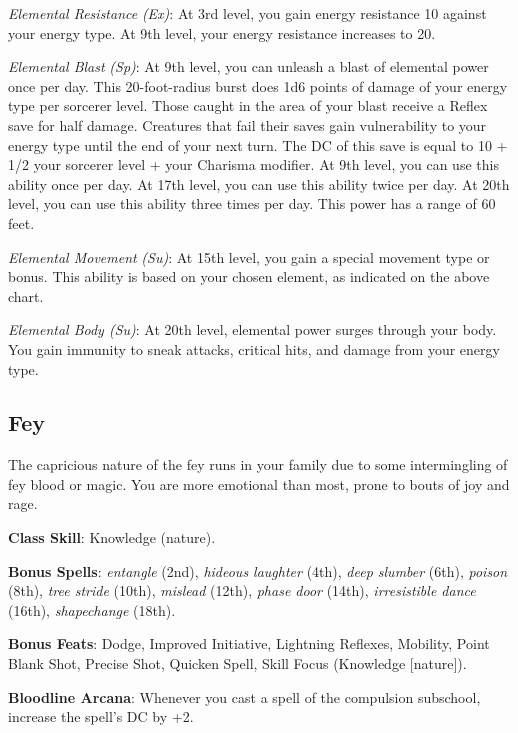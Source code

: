 \textit{Elemental Resistance} \textit{(Ex)}: At 3rd level, you gain energy resistance 10 against your energy type. At 9th level, your
energy resistance increases to 20.
				
\textit{Elemental Blast} \textit{(Sp)}: At 9th level, you can unleash a blast of elemental power once per day. This 20-foot-radius
burst does 1d6 points of damage of your energy type per sorcerer level. Those caught in the area of your blast receive a Reflex save
for half damage. Creatures that fail their saves gain vulnerability to your energy type until the end of your next turn. The DC of
this save is equal to 10 + 1/2 your sorcerer level + your Charisma modifier. At 9th level, you can use this ability once per day. At 
17th level, you can use this ability twice per day. At 20th level, you can use this ability three times per day. This power has a range
of 60 feet.
				
\textit{Elemental Movement} \textit{(Su)}: At 15th level, you gain a special movement type or bonus. This ability is based on your
chosen element, as indicated on the above chart.
				
\textit{Elemental Body (Su)}: At 20th level, elemental power surges through your body. You gain immunity to sneak attacks, critical
hits, and damage from your energy type.
				
\subsection{Fey}

The capricious nature of the fey runs in your family due to some intermingling of fey blood or magic. You are more emotional than
most, prone to bouts of joy and rage.
				
\textbf{Class Skill}: Knowledge (nature).
				
\textbf{Bonus Spells}: \textit{entangle }(2nd), \textit{hideous laughter} (4th), \textit{deep slumber} (6th), \textit{poison} (8th),
\textit{tree stride} (10th), \textit{mislead} (12th), \textit{phase door} (14th), \textit{irresistible dance} (16th),
\textit{shapechange }(18th).
				
\textbf{Bonus Feats}: Dodge, Improved Initiative, Lightning Reflexes, Mobility, Point Blank Shot, Precise Shot, Quicken Spell, Skill Focus (Knowledge \mbox{$[$}nature\mbox{$]$}).
				
\textbf{Bloodline Arcana}: Whenever you cast a spell of the compulsion subschool, increase the spell's DC by +2.
				
